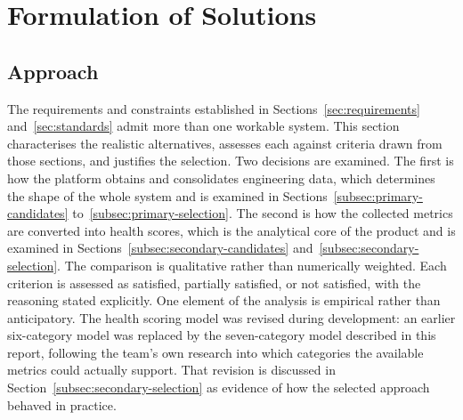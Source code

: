 \section{Formulation of Solutions}
\label{sec:alternatives}

\subsection{Approach}
\label{subsec:formulation-approach}

The requirements and constraints established in Sections~\ref{sec:requirements}
and~\ref{sec:standards} admit more than one workable system. This section characterises the realistic alternatives, assesses each against criteria
drawn from those sections, and justifies the selection.
Two decisions are examined. The first is how the platform obtains and consolidates engineering data, which determines the shape of the whole system and
is examined in Sections~\ref{subsec:primary-candidates} to~\ref{subsec:primary-selection}. The second is how the collected metrics are
converted into health scores, which is the analytical core of the product and is examined in Sections~\ref{subsec:secondary-candidates}
and~\ref{subsec:secondary-selection}.
The comparison is qualitative rather than numerically weighted. Each criterion is assessed as satisfied,
partially satisfied, or not satisfied, with the reasoning stated explicitly.
One element of the analysis is empirical rather than anticipatory. The health
scoring model was revised during development: an earlier six-category model was replaced by the seven-category model described in this report, following the
team's own research into which categories the available metrics could actually support. That revision is discussed in Section~\ref{subsec:secondary-selection}
as evidence of how the selected approach behaved in practice.
